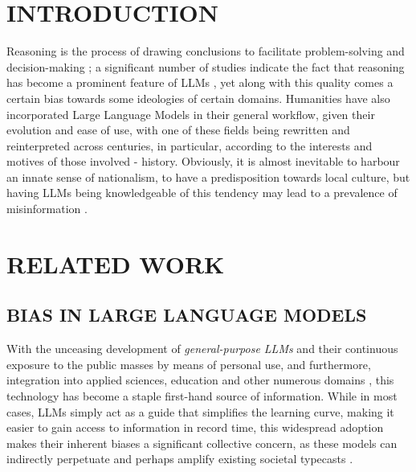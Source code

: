 \documentclass[11pt]{article}
\begin{document}
\section{\MakeUppercase{Introduction}}
Reasoning is the process of drawing conclusions to facilitate problem-solving and decision-making \cite{leighton2003}; a significant number of studies indicate the fact that reasoning has become a prominent feature of LLMs \cite{chandra2025}, yet along with this quality comes a certain bias towards some ideologies of certain domains. Humanities have also incorporated Large Language Models in their general workflow, given their evolution and ease of use, with one of these fields being rewritten and reinterpreted across centuries, in particular, according to the interests and motives of those involved - history. Obviously, it is almost inevitable to harbour an innate sense of nationalism, to have a predisposition towards local culture, but having LLMs being knowledgeable of this tendency may lead to a prevalence of misinformation \cite{cichocka2020}. 


\section{\MakeUppercase{Related Work}}
\subsection{\MakeUppercase{Bias in Large Language Models}}
With the unceasing development of \textit{general-purpose LLMs} and their continuous exposure to the public masses by means of personal use, and furthermore, integration into applied sciences, education and other numerous domains \cite{guo2024}, this technology has become a staple first-hand source of information. While in most cases, LLMs simply act as a guide that simplifies the learning curve, making it easier to gain access to information in record time, this widespread adoption makes their inherent biases a significant collective concern, as these models can indirectly perpetuate and perhaps amplify existing societal typecasts \cite{kumar2024}.
\end{document}
